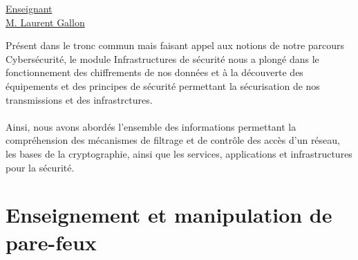\renewcommand{\figurename}{}

\vspace*{0.2cm}%
      \large
      \href{}{\color{black}Enseignant\\M. Laurent Gallon}\\%
      \normalsize
\vspace*{0.5cm}%

Présent dans le tronc commun mais faisant appel aux notions de notre parcours Cybersécurité, le module Infrastructures de sécurité nous a plongé dans le fonctionnement des chiffrements de nos données et à la découverte des équipements et des principes de sécurité permettant la sécurisation de nos transmissions et des infrastrctures.
\\ \\
Ainsi, nous avons abordés l'ensemble des informations permettant la compréhension des mécanismes de filtrage et de contrôle des accès d'un réseau, les bases de la cryptographie, ainsi que les services, applications et infrastructures pour la sécurité.

\section{Enseignement et manipulation de pare-feux}

